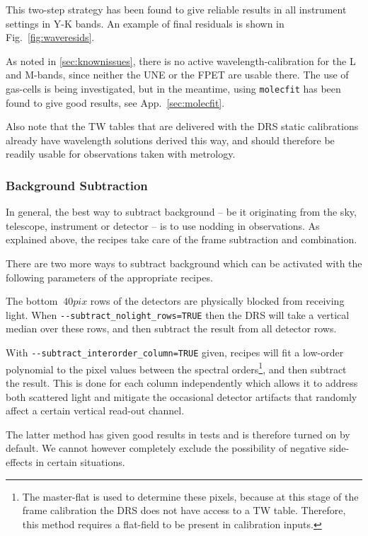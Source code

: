 This two-step strategy has been found to give reliable results in all instrument
settings in Y-K bands. An example of final residuals is shown in
Fig.~\ref{fig:waveresids}.

As noted in \ref{sec:knownissues}, there is no active wavelength-calibration for
the L and M-bands, since neither the UNE or the FPET are usable there. The use
of gas-cells is being investigated, but in the meantime, using \verb!molecfit!
has been found to give good results, see App.~\ref{sec:molecfit}.

Also note that the TW tables that are delivered with the DRS static calibrations
already have wavelength solutions derived this way, and should therefore be
readily usable for observations taken with metrology.


\subsubsection{Background Subtraction}
\label{sec:backgr}

In general, the best way to subtract background  --  be it originating from the
sky, telescope, instrument or detector  --  is to use nodding in observations.
As explained above, the recipes take care of the frame subtraction and
combination.

There are two more ways to subtract background which can be activated with the
following parameters of the appropriate recipes.

The bottom $~40pix$ rows of the detectors are physically blocked from receiving
light. When \linebreak\verb!--subtract_nolight_rows=TRUE! then the DRS will take
a vertical median over these rows, and then subtract the result from all
detector rows.

With \verb!--subtract_interorder_column=TRUE! given, recipes will fit a
low-order polynomial to the pixel values between the spectral
orders\footnote{The master-flat is used to determine these pixels, because at
this stage of the frame calibration the DRS does not have access to a TW table.
Therefore, this method requires a flat-field to be present in calibration
inputs.}, and then subtract the result. This is done for each column
independently which allows it to address both scattered light and mitigate the
occasional detector artifacts that randomly affect a certain vertical read-out
channel.

The latter method has given good results in tests and is therefore turned on by
default. We cannot however completely exclude the possibility of negative
side-effects in certain situations.

